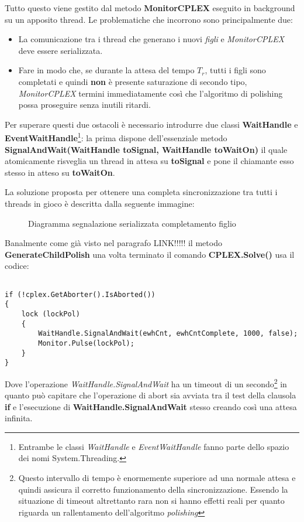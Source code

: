 \documentclass[11pt]{article}
\begin{document}
Tutto questo viene gestito dal metodo \textbf{MonitorCPLEX} eseguito in background su un apposito thread. Le problematiche che incorrono sono principalmente due:
\begin{itemize}
    \item La comunicazione tra i thread che generano i nuovi \textit{figli} e \textit{MonitorCPLEX} deve essere serializzata.
    \item Fare in modo che, se durante la attesa del tempo $T_r$, tutti i figli sono completati e quindi \textbf{non} è presente saturazione di secondo tipo, \textit{MonitorCPLEX} termini immediatamente così che l'algoritmo di polishing possa proseguire senza inutili ritardi.
\end{itemize}

Per superare questi due ostacoli è necessario introdurre due classi \textbf{WaitHandle} e \textbf{EventWaitHandle}\footnote{Entrambe le classi \textit{WaitHandle} e \textit{EventWaitHandle} fanno parte dello spazio dei nomi System.Threading.}: la prima dispone dell'essenziale metodo \textbf{SignalAndWait(WaitHandle toSignal, WaitHandle toWaitOn)} il quale atomicamente risveglia un thread in attesa su \textbf{toSignal} e pone il chiamante esso stesso in atteso su \textbf{toWaitOn}.

La soluzione proposta per ottenere una completa sincronizzazione tra tutti i threads in gioco è descritta dalla seguente immagine:

\FloatBarrier

\begin{figure}[htbp]
    \centering
    \caption{Diagramma segnalazione serializzata completamento figlio}
\end{figure}

\FloatBarrier

Banalmente come già visto nel paragrafo LINK!!!!! il metodo \textbf{GenerateChildPolish} una volta terminato il comando \textbf{CPLEX.Solve()} usa il codice:

\begin{lstlisting}

if (!cplex.GetAborter().IsAborted())
{
    lock (lockPol)
    {
        WaitHandle.SignalAndWait(ewhCnt, ewhCntComplete, 1000, false);
        Monitor.Pulse(lockPol);
    }
}

\end{lstlisting}

Dove l'operazione \textit{WaitHandle.SignalAndWait} ha un timeout di un secondo\footnote{Questo intervallo di tempo è enormemente superiore ad una normale attesa e quindi assicura il corretto funzionamento della sincronizzazione. Essendo la situazione di timeout altrettanto rara non si hanno effetti reali per quanto riguarda un rallentamento dell'algoritmo \textit{polishing}} in quanto può capitare che l'operazione di abort sia avviata tra il test della clausola \textbf{if} e l'esecuzione di \textbf{WaitHandle.SignalAndWait} stesso creando così una attesa infinita.
\end{document}
